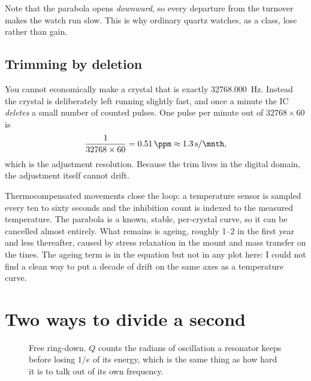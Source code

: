 \documentclass[11pt,a4paper]{article}
\begin{document}
Note that the parabola opens \emph{downward}, so every departure from the turnover makes the
watch run slow. This is why ordinary quartz watches, as a class, lose rather than gain.

\subsection{Trimming by deletion}

You cannot economically make a crystal that is exactly \SI{32768.000}{\hertz}. Instead the
crystal is deliberately left running slightly fast, and once a minute the IC \emph{deletes} a
small number of counted pulses. One pulse per minute out of $32768 \times 60$ is
\begin{equation}
\frac{1}{32768 \times 60} = \SI{0.51}{\ppm} \approx \SI{1.3}{\second\per\mnth},
\end{equation}
which is the adjustment resolution. Because the trim lives in the digital domain, the
adjustment itself cannot drift.

Thermocompensated movements close the loop: a temperature sensor is sampled every ten to sixty
seconds and the inhibition count is indexed to the measured temperature. The parabola is a
known, stable, per-crystal curve, so it can be cancelled almost entirely. What remains is
ageing, roughly \SIrange{1}{2}{\ppm} in the first year and less thereafter, caused by stress
relaxation in the mount and mass transfer on the tines. The ageing term is in the equation but
not in any plot here: I could not find a clean way to put a decade of drift on the same axes as
a temperature curve.

\section{Two ways to divide a second}

\begin{figure}[htbp]
\centering
{}
\caption{Free ring-down. $Q$ counts the radians of oscillation a resonator keeps before losing
$1/e$ of its energy, which is the same thing as how hard it is to talk out of its own
frequency.}
\end{figure}
\end{document}
